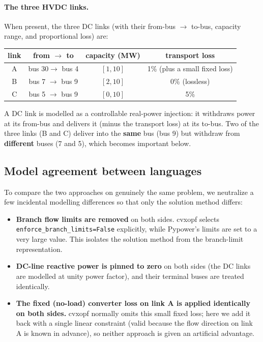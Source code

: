 \documentclass[11pt]{article}
\begin{document}
\paragraph{The three HVDC links.} When present, the three DC links (with their
from-bus $\to$ to-bus, capacity range, and proportional loss) are:

\begin{center}
\begin{tabular}{cccc}
\toprule
link & from $\to$ to & capacity (MW) & transport loss \\
\midrule
A & bus 30\footnotemark $\to$ bus 4 & $[1, 10]$ & 1\% (plus a 
	small fixed loss) \\
B & bus 7 $\to$ bus 9 & $[2, 10]$ & 0\% (lossless) \\
C & bus 5 $\to$ bus 9 & $[0, 10]$ & 5\% \\
\bottomrule
\end{tabular}
\end{center}

A DC link is modelled as a controllable real-power injection: it withdraws power
at its from-bus and delivers it (minus the transport loss) at its to-bus. Two of
the three links (B and C) deliver into the \textbf{same} bus (bus 9) but
withdraw from \textbf{different} buses (7 and 5), which becomes important below.



\subsection{Model agreement between languages}

To compare the two approaches on genuinely the same problem, we neutralize a few
incidental modelling differences so that only the solution method differs:

\begin{itemize}
  \item \textbf{Branch flow limits are removed} on both sides. cvxopf selects
    \texttt{enforce\_branch\_limits=False} explicitly, while Pypower's limits
    are set to a very large value. This isolates the solution method from the
    branch-limit representation.
  \item \textbf{DC-line reactive power is pinned to zero} on both sides (the DC
    links are modelled at unity power factor), and their terminal buses are
    treated identically.
  \item \textbf{The fixed (no-load) converter loss on link A is applied
    identically on both sides.} cvxopf normally omits this small fixed loss;
    here we add it back with a single linear constraint (valid because the flow
    direction on link A is known in advance), so neither approach is given an
    artificial advantage.
\end{itemize}
\end{document}
